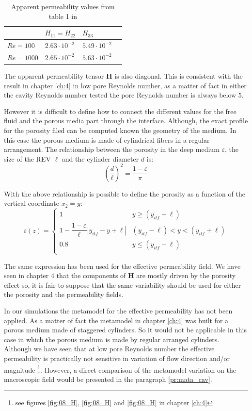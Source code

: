 \begin{table}[h]
	\centering
	\begin{tabular}{ l | l |  l   l   }
		& $H_{11} = H_{22}$ & $H_{33}$ \\ 
		\hline
		\hline
		$Re=100$ & $2.63 \cdot 10^{-2}$ & $5.49 \cdot 10^{-2}$ \\ 
		$Re=1000$ & $2.65 \cdot 10^{-2}$ & $5.63 \cdot 10^{-2}$
	\end{tabular}
	\caption{Apparent permeability values from table 1 in \citet{zampogna2016fluid}}
	\label{tab:H}
\end{table}

The apparent permeability tensor $\mathbf{H}$ is also diagonal. This is consistent with the result in chapter \ref{ch:4} in low pore Reynolds number, as a matter of fact in either the cavity Reynolds number tested the pore Reynolds number is always below $5$.

However it is difficult to define how to connect the different values for the free fluid and the porous media part through the interface.
Although, the exact profile for the porosity filed can be computed known the geometry of the medium. In this case the porous medium is made of cylindrical fibers in a regular arrangement. The relationship between the porosity in the deep medium $\varepsilon$, the size of the REV $\ell$ and the cylinder diameter $d$ is:
$$
\left( \dfrac{d}{\ell} \right)^2 = \dfrac{1 - \varepsilon}{\pi}
$$

With the above relationship is possible to define the porosity as a function of the vertical coordinate $x_2 = y$:
\begin{equation}
\varepsilon(z) = 
\begin{cases}
1 & y\geqslant(y_{itf}+\ell) \\
1 - \dfrac{1-\varepsilon}{\ell}|y_{itf} -y +\ell| &  (y_{itf}-\ell)<y<(y_{itf}+\ell)\\
0.8 &y\leqslant(y_{itf}-\ell) \\
\end{cases}
\label{eq:porsitity_fun}
\end{equation}

The same expression has been used for the effective permeability field. We have seen in chapter 4 that the components of $\mathbf{H}$ are mostly driven by the porosity effect so, it is fair to suppose that the same variability should be used for either the porosity and the permeability fields.

In our simulations the metamodel for the effective permeability has not been applied.  As a matter of fact the metamodel in chapter \ref{ch:4} was built for a porous medium made of staggered cylinders. So it would not be applicable in this case in which the porous medium is made by regular arranged cylinders.
Although we have seen that at low pore Reynolds number the effective permeability is practically not sensitive in variation of flow direction and/or magnitude \footnote{see figures \ref{fig:08_H}, \ref{fig:08_H} and \ref{fig:08_H} in chapter \ref{ch:4}}.
However, a direct comparison of the metamodel variation on the macroscopic field would be presented in the paragraph \ref{pr:mata_cav}.

